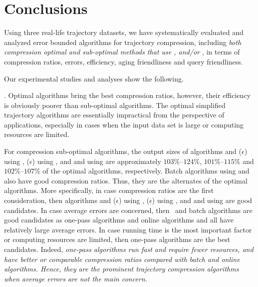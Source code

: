 \section{Conclusions}

Using three real-life trajectory datasets, we have systematically evaluated and analyzed error bounded \lsa algorithms for trajectory compression, including \emph{both compression optimal and sub-optimal methods that use \ped, \sed and/or \dad},  in terms of compression ratios, errors, efficiency, aging friendliness and query friendliness.


Our experimental studies and analyses show the following.


. Optimal algorithms bring the best compression ratios, however, their efficiency is obviously poorer than sub-optimal algorithms. The optimal simplified trajectory algorithms are essentially impractical from the perspective of applications, especially in cases when the input data set is large or computing resources are limited.

For compression sub-optimal algorithms, the output sizes of algorithms \bqsa and \siped($\epsilon$) using \ped, \cised($\epsilon$)  using \sed, and \tpa and \interval using \dad are approximately $103\%$--$124\%$, $101\%$--$115\%$ and $102\%$--$107\%$ of the optimal algorithms, respectively. Batch algorithms using \ped and \sed also have good compression ratios. Thus, they are the alternates of the optimal algorithms.
%
More specifically, in case compression ratios are the first consideration, then algorithms \bqsa and \siped($\epsilon$) using \ped, \cised($\epsilon$)  using \sed, and \tpa and \interval using \dad are good candidates.
%
In case average errors are concerned, then ~and batch algorithms are good candidates as one-pass algorithms and online algorithms \opwa and \bqsa all have relatively large average errors. %
%
In case running time is the most important factor or computing resources are limited, then one-pass algorithms are the best candidates.
%
Indeed, \emph{one-pass algorithms run fast and require fewer resources, and have better or comparable compression ratios compared with batch and online algorithms. Hence, they are the prominent trajectory compression algorithms when average errors are not the main concern.}

